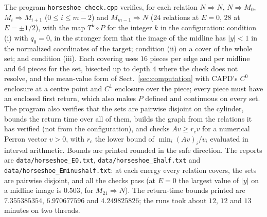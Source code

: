 \documentclass[11pt]{article}
\theoremstyle{definition}
\begin{document}
The program \texttt{horseshoe\_check.cpp} verifies, for each relation $N \Rightarrow N$, $N \Rightarrow M_0$, $M_i \Rightarrow M_{i+1}$ ($0 \le i \le m-2$) and $M_{m-1} \Rightarrow N$ ($24$ relations at $E = 0$, $28$ at $E = \pm1/2$), with the map $T^{k} \circ P$ for the integer $k$ in the configuration: condition (i) with $q_0 = 0$, in the stronger form that the image of the midline has $|y| < 1$ in the normalized coordinates of the target; condition (ii) on a cover of the whole set; and condition (iii). Each covering uses $16$ pieces per edge and per midline and $64$ pieces for the set, bisected up to depth $4$ where the check does not resolve, and the mean-value form of Sect.~\ref{sec:computation} with CAPD's $C^0$ enclosure at a centre point and $C^1$ enclosure over the piece; every piece must have an enclosed first return, which also makes $P$ defined and continuous on every set. The program also verifies that the sets are pairwise disjoint on the cylinder, bounds the return time over all of them, builds the graph from the relations it has verified (not from the configuration), and checks $Av \ge r_cv$ for a numerical Perron vector $v > 0$, with $r_c$ the lower bound of $\min_i (Av)_i/v_i$ evaluated in interval arithmetic. Bounds are printed rounded in the safe direction. The reports are \texttt{data/horseshoe\_E0.txt}, \texttt{data/horseshoe\_\allowbreak Ehalf.txt} and \texttt{data/horseshoe\_\allowbreak Eminushalf.txt}: at each energy every relation covers, the sets are pairwise disjoint, and all the checks pass (at $E = 0$ the largest value of $|y|$ on a midline image is $0.503$, for $M_{21} \Rightarrow N$). The return-time bounds printed are $7.355385354$, $6.970677596$ and $4.249825826$; the runs took about $12$, $12$ and $13$ minutes on two threads.
\end{document}
